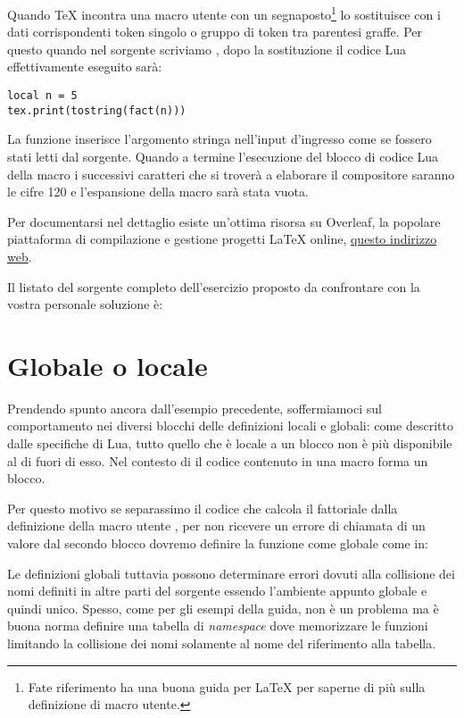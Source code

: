 Quando \TeX{} incontra una macro utente con un segnaposto\footnote{Fate
riferimento ha una buona guida per \LaTeX{} per saperne di più sulla definizione
di macro utente.} lo sostituisce con i dati corrispondenti token singolo o
gruppo di token tra parentesi graffe. Per questo quando nel sorgente scriviamo
, dopo la sostituzione il codice Lua effettivamente
eseguito sarà:
\begin{Verbatim}
local n = 5
tex.print(tostring(fact(n)))
\end{Verbatim}

La funzione  inserisce l'argomento stringa nell'input d'ingresso
come se fossero stati letti dal sorgente. Quando a termine l'esecuzione del
blocco di codice Lua della macro  i successivi caratteri che si
troverà a elaborare il compositore saranno le cifre 120 e l'espansione della
macro sarà stata vuota.

Per documentarsi nel dettaglio esiste un'ottima risorsa su Overleaf, la popolare
piattaforma di compilazione e gestione progetti \LaTeX{} online,
\href{https://cs.overleaf.com/learn/latex/Articles/An_Introduction_to_LuaTeX_(Part_2):_Understanding_%5Cdirectlua}{questo indirizzo web}.

Il listato del sorgente completo dell'esercizio proposto da confrontare con la vostra personale soluzione è:


\section{Globale o locale}
\label{secGlobaleLocale}

Prendendo spunto ancora dall'esempio precedente, soffermiamoci sul comportamento
nei diversi blocchi  delle definizioni locali e globali: come
descritto dalle specifiche di Lua, tutto quello che è locale a un blocco non è
più disponibile al di fuori di esso. Nel contesto di \LuaTeX{} il codice
contenuto in una macro  forma un blocco.

Per questo motivo se separassimo il codice che calcola il fattoriale dalla
definizione della macro utente , per non ricevere un errore di
chiamata di un valore  dal secondo blocco dovremo definire la funzione
come globale come in:

Le definizioni globali tuttavia possono determinare errori dovuti alla
collisione dei nomi definiti in altre parti del sorgente essendo l'ambiente
appunto globale e quindi unico. Spesso, come per gli esempi della guida, non è
un problema ma è buona norma definire una tabella di \emph{namespace} dove
memorizzare le funzioni limitando la collisione dei nomi solamente al nome del
riferimento alla tabella.

